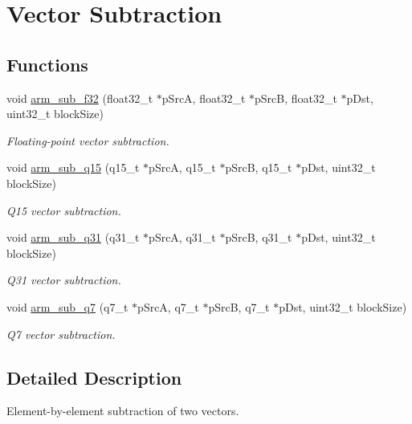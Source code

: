 \hypertarget{group__BasicSub}{}\section{Vector Subtraction}
\label{group__BasicSub}
\subsection*{Functions}
\begin{DoxyCompactItemize}
\item 
void \hyperlink{group__BasicSub_ga7f975a472de286331134227c08aad826}{arm\+\_\+sub\+\_\+f32} (float32\+\_\+t $\ast$p\+SrcA, float32\+\_\+t $\ast$p\+SrcB, float32\+\_\+t $\ast$p\+Dst, uint32\+\_\+t block\+Size)
\begin{DoxyCompactList}\small\item\em Floating-\/point vector subtraction. \end{DoxyCompactList}\item 
void \hyperlink{group__BasicSub_ga997a8ee93088d15bda23c325d455b588}{arm\+\_\+sub\+\_\+q15} (q15\+\_\+t $\ast$p\+SrcA, q15\+\_\+t $\ast$p\+SrcB, q15\+\_\+t $\ast$p\+Dst, uint32\+\_\+t block\+Size)
\begin{DoxyCompactList}\small\item\em Q15 vector subtraction. \end{DoxyCompactList}\item 
void \hyperlink{group__BasicSub_ga28aa6908d092752144413e21933dc878}{arm\+\_\+sub\+\_\+q31} (q31\+\_\+t $\ast$p\+SrcA, q31\+\_\+t $\ast$p\+SrcB, q31\+\_\+t $\ast$p\+Dst, uint32\+\_\+t block\+Size)
\begin{DoxyCompactList}\small\item\em Q31 vector subtraction. \end{DoxyCompactList}\item 
void \hyperlink{group__BasicSub_gab09941de7dfeb247e5c29b406a435fcc}{arm\+\_\+sub\+\_\+q7} (q7\+\_\+t $\ast$p\+SrcA, q7\+\_\+t $\ast$p\+SrcB, q7\+\_\+t $\ast$p\+Dst, uint32\+\_\+t block\+Size)
\begin{DoxyCompactList}\small\item\em Q7 vector subtraction. \end{DoxyCompactList}\end{DoxyCompactItemize}


\subsection{Detailed Description}
Element-\/by-\/element subtraction of two vectors.


